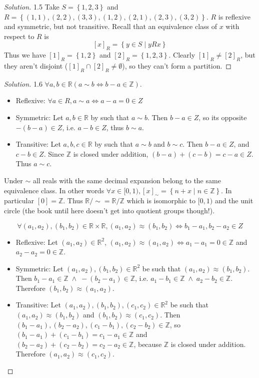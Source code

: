 \documentclass{article}
\theoremstyle{definition}
\newcommand{\bb}[1]{\mathbb{#1}}
\newcommand{\Z}{\bb{Z}}
\newcommand{\R}{\bb{R}}
\newcommand{\AND}{\;\wedge\;}
\newcommand{\set}[1]{\left\{#1\right\}}
\newcommand{\bra}[1]{\left[#1\right]}
\theoremstyle{definition}
\newenvironment{solution}{%
  \begin{proof}[Solution]
  \vspace{-8px}
  \setlength{\parskip}{4px}
  \setlength{\parindent}{0px}
}{
  \end{proof}
}
\begin{document}
\begin{solution}
1.5 Take $S = \set{1,2,3}$ and $R = \set{(1,1), (2,2), (3,3), (1,2), (2,1),
(2,3), (3,2)}$. $R$ is reflexive and symmetric, but not transitive. Recall that
an equivalence class of $x$ with respect to $R$ is
\[ \bra{x}_R = \set{y \in S \mid yRx} \]
Thus we have $\bra{1}_R = \set{1,2}$ and $\bra{2}_R = \set{1,2,3}$. Clearly
$\bra{1}_R \neq \bra{2}_R$, but they aren't disjoint ($\bra{1}_R \cap \bra{2}_R
\neq \emptyset$), so they can't form a partition.
\end{solution}

\begin{solution}
1.6 $\forall a, b \in \R (a \sim b \iff b - a \in \Z)$.
\begin{itemize}
\item Reflexive: $\forall a \in R, a \sim a \iff a - a = 0 \in Z$
\item Symmetric: Let $a,b \in \R$ by such that $a \sim b$. Then $b - a \in Z$, so its opposite $-(b-a) \in Z$, i.e. $a-b \in Z$, thus $b \sim a$.
\item Transitive: Let $a, b, c \in \R$ by such that $a \sim b$ and $b \sim c$. Then $b - a \in Z$, and $c - b \in Z$. Since $\Z$ is closed under addition, $(b-a) + (c-b) = c - a \in Z$. Thus $a \sim c$.
\end{itemize}
Under $\sim$ all reals with the same decimal expansion belong to the same
equivalence class. In other words $\forall x \in [0,1), \bra{x}_{\sim} = \set{n + x \mid n \in \Z}$.
In particular $\bra{0} = \Z$. Thus $\R/\sim = \R/\Z$ which is isomorphic to
$[0,1)$ and the unit circle (the book until here doesn't get into quotient
groups though!).

\[ \forall (a_1, a_2), (b_1, b_2) \in \R \times \R, (a_1, a_2) \approx (b_1, b_2) \iff b_1 - a_1, b_2 - a_2 \in Z \]

\begin{itemize}
\item Reflexive: Let $(a_1, a_2) \in \R^2$, $(a_1, a_2) \approx (a_1, a_2) \iff a_1 - a_1 = 0 \in \Z$ and $a_2 - a_2 = 0 \in \Z$.
\item Symmetric: Let $(a_1, a_2), (b_1, b_2) \in \R^2$ be such that $(a_1, a_2) \approx (b_1, b_2)$.
Then $b_1 - a_1 \in \Z \AND -(b_2 - a_1) \in \Z$, i.e.  $a_1 -b_1 \in \Z \AND a_2 - b_2 \in \Z$.
Therefore $(b_1, b_2) \approx (a_1, a_2)$.
\item Transitive: Let $(a_1, a_2), (b_1, b_2), (c_1, c_2) \in \R^2$ be such that $(a_1, a_2) \approx (b_1, b_2)$ and $(b_1, b_2) \approx (c_1, c_2)$. Then $(b_1 - a_1), (b_2 - a_2), (c_1 - b_1), (c_2 - b_2) \in \Z$, so $(b_1 - a_1) + (c_1 - b_1) = c_1 - a_1 \in \Z$ and $(b_2 - a_2) + (c_2 - b_2) = c_2 - a_2 \in \Z$, because $\Z$ is closed under addition. Therefore $(a_1, a_2) \approx (c_1, c_2)$.
\end{itemize}
\end{solution}
\end{document}
